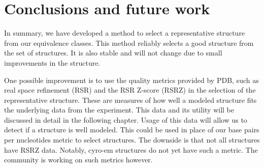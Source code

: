 \section{Conclusions and future work}

In summary, we have developed a method to select a representative structure from
our equivalence classes. This method reliably selects a good structure from the
set of structures. It is also stable and will not change due to small
improvements in the structure.

One possible improvement is to use the quality metrics provided by PDB, such as
real space refinement (RSR) and the RSR Z-score (RSRZ) in the selection of the
representative structure. These are measures of how well a modeled structure
fits the underlying data from the experiment. This data and its utility will be
discussed in detail in the following chapter. Usage of this data will allow us
to detect if a structure is well modeled. This could be used in place of our
base pairs per nucleotides metric to select structures. The downside is that not
all structures have RSRZ data. Notably, cyro-em structures do not yet have such
a metric. The community is working on such metrics however.
